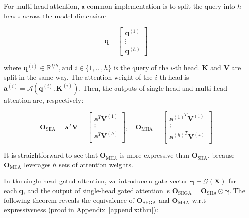 For multi-head attention, a common implementation is to split the query into $h$ heads across the model dimension:

\begin{equation}
\boldsymbol{q} = \left[
\begin{array}{c}
\boldsymbol{q}^{(1)} \\
\vdots \\
\boldsymbol{q}^{(h)}
\end{array}
\right]
\end{equation}

where $\boldsymbol{q}^{(i)} \in \mathbb{R}^{d/h}, \mbox{and} \,\, i \in \{1, \ldots, h \}$ is the query of the $i$-th head.
$\boldsymbol{K}$ and $\boldsymbol{V}$ are split in the same way. The attention weight of the $i$-th head is $\boldsymbol{a}^{(i)} = \mathcal{A}(\boldsymbol{q}^{(i)}, \boldsymbol{K}^{(i)})$. 
Then, the outputs of single-head and multi-head attention are, respectively:

\begin{equation}
\boldsymbol{O}_{\mathrm{SHA}} = \boldsymbol{a}^T \boldsymbol{V} = \left[ 
\begin{array}{c}
\boldsymbol{a}^T \boldsymbol{V}^{(1)} \\
\vdots \\
\boldsymbol{a}^T \boldsymbol{V}^{(h)} \\
\end{array}
\right],
\quad 
\boldsymbol{O}_{\mathrm{MHA}} = \left[ 
\begin{array}{c}
{\boldsymbol{a}^{(1)}}^T \boldsymbol{V}^{(1)} \\
\vdots \\
{\boldsymbol{a}^{(h)}}^T \boldsymbol{V}^{(h)} \\
\end{array}
\right]
\end{equation}

It is straightforward to see that $\boldsymbol{O}_{\mathrm{MHA}}$ is more expressive than $\boldsymbol{O}_{\mathrm{SHA}}$, because $\boldsymbol{O}_{\mathrm{MHA}}$ leverages $h$ sets of attention weights.

In the single-head gated attention, we introduce a gate vector $\boldsymbol{\gamma} = \mathcal{G}(\boldsymbol{X})$ for each $\boldsymbol{q}$, and the output of single-head gated attention is $\boldsymbol{O}_{\mathrm{SHGA}} = \boldsymbol{O}_{\mathrm{SHA}} \odot \boldsymbol{\gamma}$.
The following theorem reveals the equivalence of $\boldsymbol{O}_{\mathrm{SHGA}}$ and $\boldsymbol{O}_{\mathrm{MHA}}$ w.r.t expressiveness (proof in Appendix~\ref{appendix:thm}):

